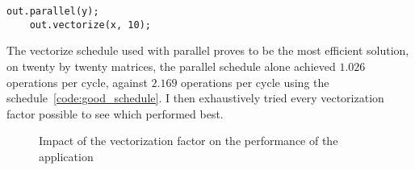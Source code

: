 \lstset{basicstyle=\ttfamily\footnotesize,breaklines=true,tabsize=2}
\begin{lstlisting}[caption={Schedule using Parallel and Vectorize}, captionpos=b, label={code:good_schedule}]
	out.parallel(y);
	out.vectorize(x, 10);

\end{lstlisting}

	The vectorize schedule used with parallel proves to be the most efficient solution, on twenty by twenty matrices, the parallel schedule alone achieved $1.026$ operations per cycle, against $2.169$ operations per cycle using the schedule~\ref{code:good_schedule}.
	I then exhaustively tried every vectorization factor possible to see which performed best.

\begin{figure}[H]
	\begin{center}
	\resizebox{10cm}{!}{}
	\label{Fig:Vectorization}
		\caption{Impact of the vectorization factor on the performance of the application}
	\end{center}
\end{figure}







%
